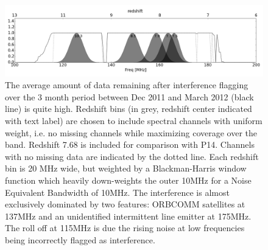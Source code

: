 \documentclass[preprint]{aastex}
\begin{document}
  
 \begin{figure}
\centering
\includegraphics[width=\textwidth]{figures/psa32_flagging_zbins.png}
\caption{\label{fig:bins} The average amount of data remaining after interference flagging over the 3 month period between Dec 2011 and March 2012 (black line) is quite high.  Redshift bins (in grey, redshift center indicated with text label) are chosen to include spectral channels with uniform weight, i.e. no missing channels while maximizing coverage over the band.  Redshift 7.68 is included for comparison with P14.  Channels with no missing data are indicated by the dotted line. Each redshift bin is 20 MHz wide, but weighted by a Blackman-Harris window function which heavily down-weights the outer 10MHz for a Noise Equivalent Bandwidth of 10MHz.  The interference is almost exclusively dominated by two features: ORBCOMM satellites at 137MHz and an unidentified intermittent line emitter at 175MHz. The roll off at 115MHz is due the rising noise at low frequencies being incorrectly flagged as interference.  }
\end{figure} 
\end{document}
